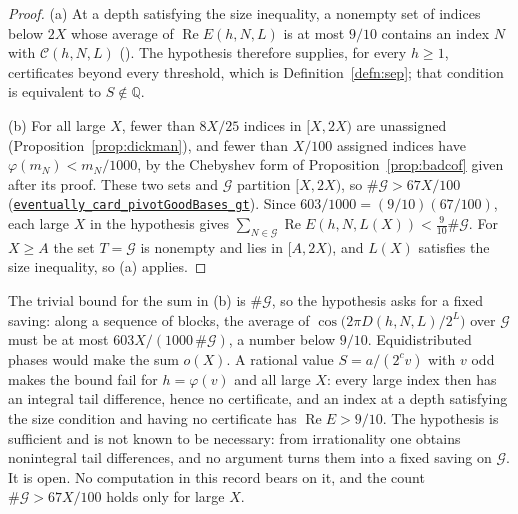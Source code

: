 \documentclass[11pt]{article}
\theoremstyle{plain}
\theoremstyle{definition}
\theoremstyle{remark}
\newcommand{\lean}[2]{\leanlink{#2}}
\newcommand{\Q}{\mathbb{Q}}
\begin{document}
\begin{proof}
(a) At a depth satisfying the size inequality, a nonempty set of indices
below $2X$ whose average of $\operatorname{Re}E(h,N,L)$ is at most $9/10$
contains an index $N$ with $\mathcal C(h,N,L)$
(\lean{Erdos249257.TotientTailPeriodKiller.exists_certifiedKill_of_first_harmonic_gap_subset}{FirstHarmonicGap.lean:104}).
The hypothesis therefore supplies, for every $h\ge1$, certificates beyond
every threshold, which is Definition~\ref{defn:sep}; that condition is
equivalent to $S\notin\Q$.

(b) For all large $X$, fewer than $8X/25$ indices in $[X,2X)$ are
unassigned (Proposition~\ref{prop:dickman}), and fewer than $X/100$
assigned indices have $\varphi(m_N)<m_N/1000$, by the Chebyshev form of
Proposition~\ref{prop:badcof} given after its proof. These two sets and
$\mathcal G$ partition $[X,2X)$, so $\#\mathcal G>67X/100$
(\href{https://github.com/wcook04/plectis-erdos/blob/24edbddbe2bd68e920327a701aad0b9dd0d69675/lean/ErdosProblems/ArgumentGraph/Results/Erdos249Endpoint.lean\#L75}{\texttt{eventually\_card\_pivotGoodBases\_gt}}).
Since $603/1000=(9/10)(67/100)$, each large $X$ in the hypothesis gives
$\sum_{N\in\mathcal G}\operatorname{Re}E(h,N,L(X))<\tfrac{9}{10}\#\mathcal G$.
For $X\ge A$ the set $T=\mathcal G$ is nonempty and lies in $[A,2X)$, and
$L(X)$ satisfies the size inequality, so (a) applies.
\end{proof}

The trivial bound for the sum in (b) is $\#\mathcal G$, so the
hypothesis asks for a fixed saving: along a sequence of blocks, the
average of $\cos\bigl(2\pi D(h,N,L)/2^L\bigr)$ over $\mathcal G$ must be
at most $603X/(1000\,\#\mathcal G)$, a number below $9/10$.
Equidistributed phases would make the sum $o(X)$. A rational value
$S=a/(2^cv)$ with $v$ odd makes the bound fail for $h=\varphi(v)$ and all
large $X$: every large index
then has an integral tail difference, hence no certificate, and an index
at a depth satisfying the size condition and having no certificate has
$\operatorname{Re}E>9/10$.
The hypothesis is sufficient and is not known to be necessary: from
irrationality one obtains nonintegral tail differences, and no argument
turns them into a fixed saving on $\mathcal G$. It is open. No computation in this record bears
on it, and the count $\#\mathcal G>67X/100$ holds only for large $X$.
\end{document}
